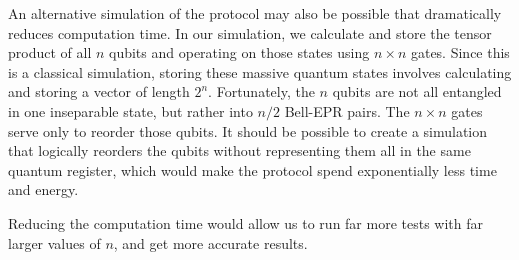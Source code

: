 \documentclass[conference,compsoc]{IEEEtran}
\begin{document}
An alternative simulation of the protocol may also be possible that dramatically reduces computation time.
In our simulation, we calculate and store the tensor product of all $n$ qubits and operating on those states
using $n \times n$ gates. Since this is a classical simulation, storing these massive quantum states involves
calculating and storing a vector of length $2^n$. Fortunately, the $n$ qubits are not all entangled in one
inseparable state, but rather into $n/2$ Bell-EPR pairs. The $n \times n$ gates serve only to reorder those qubits.
It should be possible to create a simulation that logically reorders the qubits without representing
them all in the same quantum register, which would make the protocol spend exponentially less time and energy.

Reducing the computation time would allow us to run far more tests with far larger values of $n$, and get
more accurate results.

\mydata
\end{document}
